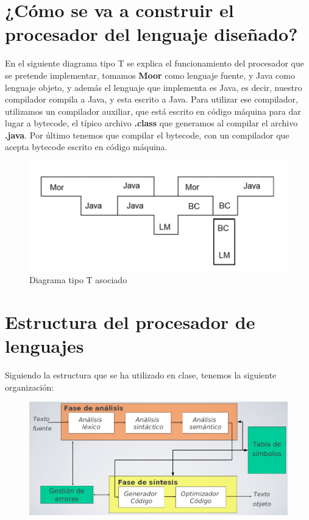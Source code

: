 \documentclass[12pt,a4paper]{article}
\begin{document}
{	\section{¿Cómo se va a construir el procesador del lenguaje diseñado?}
	En el siguiente diagrama tipo T se explica el funcionamiento del procesador que se pretende implementar, tomamos \textbf{ Moor } como lenguaje fuente, y Java como lenguaje objeto, y además el lenguaje que implementa es Java, es decir, nuestro compilador compila a Java, y esta escrito a Java. 
	\newline
	Para utilizar ese compilador, utilizamos un compilador auxiliar, que está escrito en código máquina para dar lugar a bytecode, el típico archivo \textbf{.class} que generamos al compilar el archivo \textbf{.java}.
	\newline
	Por último tenemos que compilar el bytecode, con un compilador que acepta bytecode escrito en código máquina.
	
	\begin{figure}[h]
		\centering
		\includegraphics[width=0.7
		\linewidth]{img/photo5978652419892031524}
		\caption{Diagrama tipo T asociado}
		\label{fig:photo5978652419892031524}
	\end{figure}
	
	\section{Estructura del procesador de lenguajes}
	Siguiendo la estructura que se ha utilizado en clase, tenemos la siguiente organización:
	\begin{figure}[h]
		\centering
		\includegraphics[width=0.7\linewidth]{img/estructura}
		\caption{}
		\label{fig:estructura}
	\end{figure}
	
}
\end{document}
